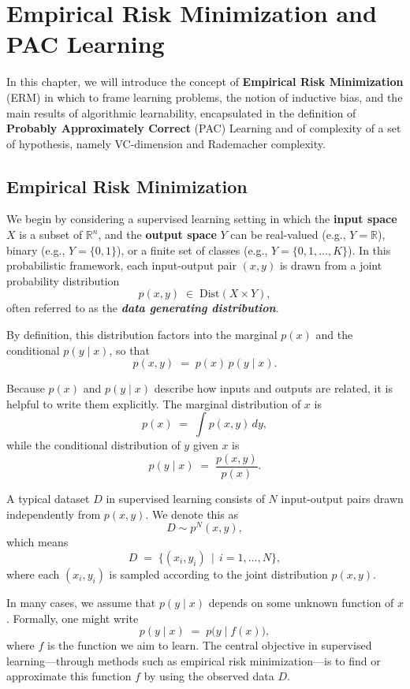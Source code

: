\newpage
\chapter{Empirical Risk Minimization and PAC Learning}

In this chapter, we will introduce the concept of \textbf{Empirical Risk Minimization} (ERM) in which to frame learning problems, the notion of inductive bias, and the main results of algorithmic learnability, encapsulated in the definition of \textbf{Probably Approximately Correct} (PAC) Learning and of complexity of a set of hypothesis, namely
VC-dimension and Rademacher complexity.

\section{Empirical Risk Minimization}

We begin by considering a supervised learning setting in which the \textbf{input space} $X$ is a subset of $\mathbb{R}^n$, and the \textbf{output space} $Y$ can be real-valued (e.g., $Y = \mathbb{R}$), binary (e.g., $Y = \{0,1\}$), or a finite set of classes (e.g., $Y = \{0,1,\ldots,K\}$). In this probabilistic framework, each input-output pair $(x,y)$ is drawn from a joint probability distribution
$$
p(x,y) \;\in\; \mathrm{Dist}(X \times Y),
$$
often referred to as the \emph{\textbf{data generating distribution}}. 

By definition, this distribution factors into the marginal $p(x)$ and the conditional $p(y \mid x)$, so that
$$
p(x,y) \;=\; p(x)\,p(y \mid x).
$$

Because $p(x)$ and $p(y \mid x)$ describe how inputs and outputs are related, it is helpful to write them explicitly. The marginal distribution of $x$ is
$$
p(x) \;=\; \int p(x,y)\,dy,
$$
while the conditional distribution of $y$ given $x$ is
$$
p(y \mid x) \;=\; \frac{p(x,y)}{p(x)}.
$$

A typical dataset $D$ in supervised learning consists of $N$ input-output pairs drawn independently from $p(x,y)$. We denote this as
$$
D \sim p^N(x,y),
$$
which means
$$
D \;=\; \{(x_i, y_i) \,\mid\, i = 1, \dots, N\},
$$
where each $(x_i, y_i)$ is sampled according to the joint distribution $p(x,y)$. 

In many cases, we assume that $p(y \mid x)$ depends on some unknown function of $x$. Formally, one might write
$$
p(y \mid x) \;=\; p\bigl(y \mid f(x)\bigr),
$$
where $f$ is the function we aim to learn. The central objective in supervised learning—through methods such as empirical risk minimization—is to find or approximate this function $f$ by using the observed data $D$.

